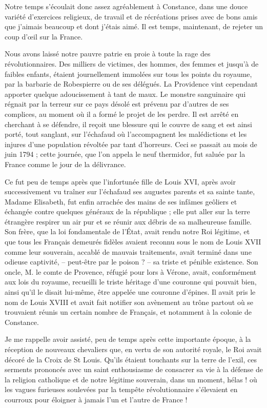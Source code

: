 \documentclass[11pt,a4paper]{report}
\begin{document}
\vspace{0.3cm}\hrulefill\vspace{0.3cm}

Notre temps s'écoulait donc assez agréablement à Constance, dans une douce variété d'exercices religieux, de travail et de récréations prises avec de bons amis que j'aimais beaucoup et dont j'étais aimé. Il est temps, maintenant, de rejeter un coup d'œil sur la France.

Nous avons laissé notre pauvre patrie en proie à toute la rage des révolutionnaires. Des milliers de victimes, des hommes, des femmes et jusqu'à de faibles enfants, étaient journellement immolées sur tous les points du royaume, par la barbarie de Robespierre ou de ses délégués. La Providence vint cependant apporter quelque adoucissement à tant de maux. Le monstre sanguinaire qui régnait par la terreur sur ce pays désolé est prévenu par d'autres de ses complices, au moment où il a formé le projet de les perdre. Il est arrêté en cherchant à se défendre, il reçoit une blessure qui le couvre de sang et est ainsi porté, tout sanglant, sur l'échafaud où l'accompagnent les malédictions et les injures d'une population révoltée par tant d'horreurs. Ceci se passait au mois de juin 1794 ; cette journée, que l'on appela le neuf thermidor, fut saluée par la France comme le jour de la délivrance.

Ce fut peu de temps après que l'infortunée fille de Louis XVI, après avoir successivement vu traîner sur l'échafaud ses augustes parents et sa sainte tante, Madame Elisabeth, fut enfin arrachée des mains de ses infâmes geôliers et échangée contre quelques généraux de la république ; elle put aller sur la terre étrangère respirer un air pur et se réunir aux débris de sa malheureuse famille. Son frère, que la loi fondamentale de l'État, avait rendu notre Roi légitime, et que tous les Français demeurés fidèles avaient reconnu sous le nom de Louis XVII comme leur souverain, accablé de mauvais traitements, avait terminé dans une odieuse captivité, -- peut-être par le poison ? -- sa triste et pénible existence. Son oncle, M. le comte de Provence, réfugié pour lors à Vérone, avait, conformément aux lois du royaume, recueilli le triste héritage d'une couronne qui pouvait bien, ainsi qu'il le disait lui-même, être appelée une couronne d'épines. Il avait pris le nom de Louis XVIII et avait fait notifier son avènement au trône partout où se trouvaient réunis un certain nombre de Français, et notamment à la colonie de Constance.

Je me rappelle avoir assisté, peu de temps après cette importante époque, à la réception de nouveaux chevaliers que, en vertu de son autorité royale, le Roi avait décoré de la Croix de St Louis. Qu'ils étaient touchants sur la terre de l'exil, ces serments prononcés avec un saint enthousiasme de consacrer sa vie à la défense de la religion catholique et de notre légitime souverain, dans un moment, hélas ! où les vagues furieuses soulevées par la tempête révolutionnaire s'élevaient en courroux pour éloigner à jamais l'un et l'autre de France !
\end{document}
